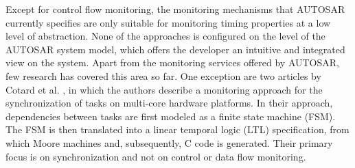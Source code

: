 Except for control flow monitoring, the monitoring mechanisms that AUTOSAR currently specifies are only suitable for monitoring timing properties at a low level of abstraction. 
None of the approaches is configured on the level of the AUTOSAR system model, which offers the developer an intuitive and integrated view on the system.
Apart from the monitoring services offered by AUTOSAR, few research has covered this area so far.
One exception are two articles by Cotard et al. \cite{Cotard2012a,Cotard2012b}, in which the authors describe a monitoring approach for the synchronization of tasks on multi-core hardware platforms. 
In their approach, dependencies between tasks are first modeled as a finite state machine (FSM).
The FSM is then translated into a linear temporal logic (LTL) specification, from which Moore machines and, subsequently, C code is generated.
Their primary focus is on synchronization and not on control or data flow monitoring.
%
%

%
%

